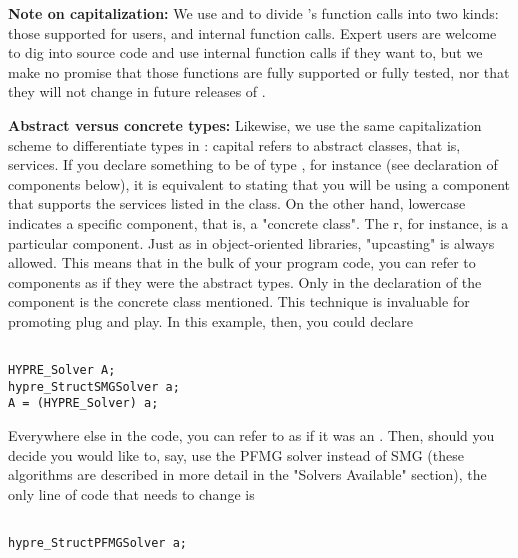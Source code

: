 {\bf Note on capitalization:} We use  and 
to divide \hypre{}'s function
calls into two kinds: 
those supported for users, and internal function calls. Expert users are
welcome to dig into \hypre{} source 
code and use internal function calls if they want to, but we make no promise
that those functions are fully 
supported or fully tested, nor that they will not change in future releases of
\hypre{}. 

{\bf Abstract versus concrete types:} 
Likewise, we use the same capitalization scheme
to differentiate types in 
\hypre{}: capital  refers to abstract classes, that is, services. 
If you
declare something to be of 
type , for instance (see declaration of components below), it is
equivalent to stating that you 
will be using a component that supports the services listed in the 
class. On the other hand, 
lowercase  indicates a specific component, that is, a "concrete class".
The r, 
for instance, is a particular component. Just as in object-oriented libraries,
"upcasting" is always allowed. 
This means that in the bulk of your program code, you can refer to components
as if they were the abstract 
types. Only in the declaration of the component is the concrete class
mentioned. This technique is 
invaluable for promoting plug and play. In this example, then, you could
declare 

\begin{display}
\begin{verbatim}

HYPRE_Solver A; 
hypre_StructSMGSolver a; 
A = (HYPRE_Solver) a; 

\end{verbatim}
\end{display}

Everywhere else in the code, you
can refer to  as if it 
was an . Then, should you decide you would like to, say, 
use the PFMG solver
instead of SMG (these 
algorithms are described in more detail in the "Solvers Available" section),
the only line of code that needs 
to change is 

\begin{display}
\begin{verbatim}

hypre_StructPFMGSolver a;

\end{verbatim}
\end{display}

